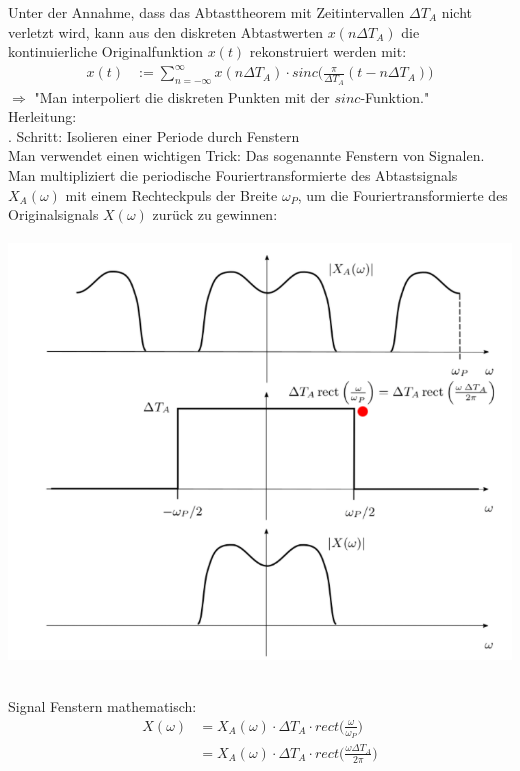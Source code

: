 \documentclass[12pt,a4paper]{scrartcl}
\begin{document}
  \noindent   Unter der Annahme, dass das Abtasttheorem mit Zeitintervallen $\Delta T_A$ nicht verletzt wird,
  kann aus den diskreten Abtastwerten $x(n \Delta T_A)$ 
  die kontinuierliche Originalfunktion $x(t)$ rekonstruiert werden mit:
  \begin{equation}
    \label{eq:15}
    \begin{split}
     x(t) &:= \sum_{n=-\infty}^{\infty} x(n \Delta T_A) \cdot sinc\bigg(\frac{\pi}{\Delta T_A}(t-n\Delta T_A)\bigg)
    \end{split}
  \end{equation} 
  $\Rightarrow$ "Man interpoliert die diskreten Punkten mit der $sinc$-Funktion." \\

  \noindent Herleitung: \\
  . Schritt: Isolieren einer Periode durch Fenstern\\
  Man verwendet einen wichtigen Trick: Das sogenannte Fenstern von Signalen. \\
  Man multipliziert die periodische Fouriertransformierte des Abtastsignals $X_A(\omega)$ 
  mit einem Rechteckpuls der Breite $\omega_P$, 
  um die Fouriertransformierte des Originalsignals $X(\omega)$ zurück zu gewinnen:\\
  
  \includegraphics[height = 12cm]{Pictures/Fenstern.png}

  \noindent Signal Fenstern mathematisch: \\
  \begin{equation}
    \label{eq:116}
    \begin{split}
      X(\omega) &= X_A(\omega) \cdot \Delta T_A \cdot rect\bigg(\frac{\omega}{\omega_P}\bigg) \\
      &= X_A(\omega) \cdot \Delta T_A \cdot rect\bigg(\frac{\omega \Delta T_A}{2\pi}\bigg)
    \end{split}
  \end{equation} 
\end{document}
